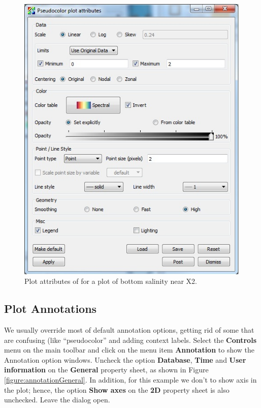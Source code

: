 \documentclass[12pt]{report}
\begin{document}
			  \begin{figure}
        \begin{center}
        \includegraphics {saltColorAttr}
        \caption{Plot attributes of for a plot of bottom salinity near X2.}
        \label{figure:saltColorAttr}
        \end{center}
        \end{figure} 
				
				
\subsection{Plot Annotations}
			 
We usually override most of default annotation options, getting rid of some that are confusing (like "`pseudocolor"' and 
adding context labels. Select the {\bf Controls} menu on the main toolbar and click on the menu item {\bf Annotation} to show 
the Annotation option windows. Uncheck the option {\bf Database}, {\bf Time} and {\bf User information} on the {\bf General} property sheet, as shown in Figure \ref{figure:annotationGeneral}. In addition, for this example we don't to show axis in the plot; hence, the option {\bf Show axes} on the {\bf 2D}  property sheet is also unchecked. Leave the dialog open.
			
\end{document}
